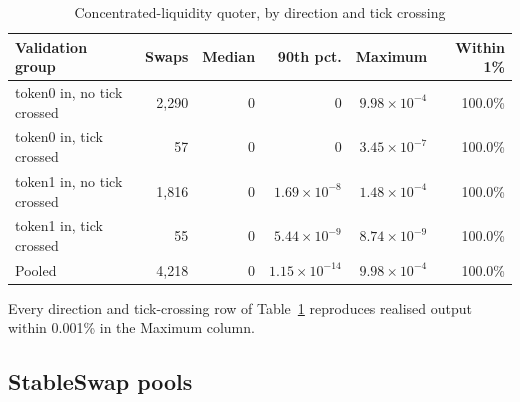 \begin{table}[t]
\centering
\caption{Concentrated-liquidity quoter, by direction and tick crossing}
\label{tab:app:cl}
\begin{tabular}{lrrrrr}
\toprule
Validation group & Swaps & Median & 90th pct. & Maximum & Within 1\% \\
\midrule
token0 in, no tick crossed & 2{,}290 & $0$ & $0$ & $9.98\times10^{-4}$ & 100.0\% \\
token0 in, tick crossed & 57 & $0$ & $0$ & $3.45\times10^{-7}$ & 100.0\% \\
token1 in, no tick crossed & 1{,}816 & $0$ & $1.69\times10^{-8}$ & $1.48\times10^{-4}$ & 100.0\% \\
token1 in, tick crossed & 55 & $0$ & $5.44\times10^{-9}$ & $8.74\times10^{-9}$ & 100.0\% \\
\midrule
Pooled & 4{,}218 & $0$ & $1.15\times10^{-14}$ & $9.98\times10^{-4}$ & 100.0\% \\
\bottomrule
\end{tabular}
\end{table}

Every direction and tick-crossing row of Table~\ref{tab:app:cl} reproduces realised output within 0.001\% in the Maximum column.

\subsection{StableSwap pools}
\label{app:quoters:stable}

